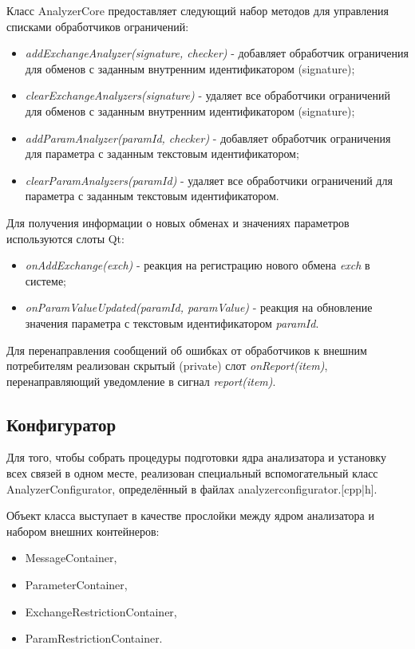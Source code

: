 Класс AnalyzerCore предоставляет следующий набор методов для управления 
списками обработчиков ограничений:

\begin{itemize}
 \item \textit{addExchangeAnalyzer(signature, checker)} - добавляет 
обработчик ограничения для обменов с заданным внутренним идентификатором 
(signature);
 \item \textit{clearExchangeAnalyzers(signature)} - удаляет все обработчики 
ограничений для обменов с заданным внутренним идентификатором (signature);
 \item \textit{addParamAnalyzer(paramId, checker)} - добавляет обработчик 
ограничения для параметра с заданным текстовым идентификатором;
 \item \textit{clearParamAnalyzers(paramId)} - удаляет все обработчики 
ограничений для параметра с заданным текстовым идентификатором.
\end{itemize}

Для получения информации о новых обменах и значениях параметров используются 
слоты Qt:

\begin{itemize}
 \item \textit{onAddExchange(exch)} - реакция на регистрацию нового обмена 
\textit{exch} в системе;
 \item \textit{onParamValueUpdated(paramId, paramValue)} - реакция на 
обновление значения параметра с текстовым идентификатором \textit{paramId}.
\end{itemize}

Для перенаправления сообщений об ошибках от обработчиков к внешним потребителям 
реализован скрытый (private) слот \textit{onReport(item)}, перенаправляющий 
уведомление в сигнал \textit{report(item)}.

\subsection{Конфигуратор}

Для того, чтобы собрать процедуры подготовки ядра анализатора и установку всех 
связей в одном месте, реализован специальный вспомогательный класс 
AnalyzerConfigurator, определённый в файлах analyzerconfigurator.[cpp|h]. 

Объект класса выступает в качестве прослойки между ядром анализатора 
и набором внешних контейнеров:

\begin{itemize}
 \item MessageContainer,
 \item ParameterContainer,
 \item ExchangeRestrictionContainer,
 \item ParamRestrictionContainer.
\end{itemize}

